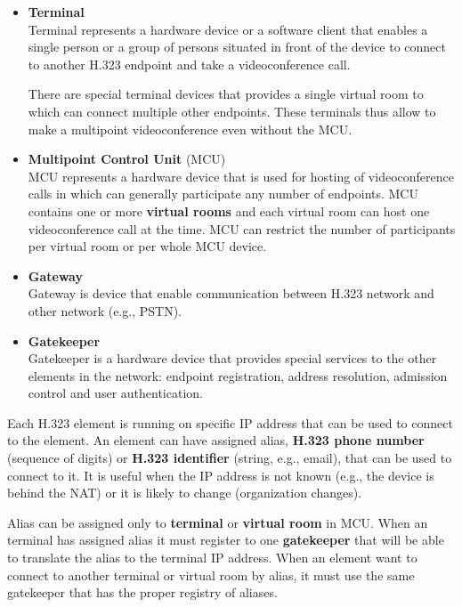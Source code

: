 \documentclass[a4paper]{report}
\begin{document}
\begin{itemize}

\item \textbf{Terminal} \\
Terminal represents a hardware device or a software client that enables a single person or a group of persons situated in front of the device to connect to another H.323 endpoint and take a videoconference call.

There are special terminal devices that provides a single virtual room to which can connect multiple other endpoints.  These terminals thus allow to make a multipoint videoconference even without the MCU.

\item \textbf{Multipoint Control Unit} (MCU) \\
MCU represents a hardware device that is used for hosting of videoconference calls in which can generally participate any number of endpoints. MCU contains one or more \textbf{virtual rooms} and each virtual room can host one videoconference call at the time. MCU can restrict the number of participants per virtual room or per whole MCU device.

\item \textbf{Gateway} \\
Gateway is device that enable communication between H.323 network and other network (e.g., PSTN).

\item \textbf{Gatekeeper} \\
Gatekeeper is a hardware device that provides special services to the other elements in the network: endpoint registration, address resolution, admission control and user authentication.

\end{itemize}

Each H.323 element is running on specific IP address that can be used to connect to the element. An element can have assigned alias, \textbf{H.323 phone number} (sequence of digits) or \textbf{H.323 identifier} (string, e.g., email), that can be used to connect to it. It is useful when the IP address is not known (e.g., the device is behind the NAT) or it is likely to change (organization changes).

Alias can be assigned only to \textbf{terminal} or \textbf{virtual room} in MCU. When an terminal has assigned alias it must register to one \textbf{gatekeeper} that will be able to translate the alias to the terminal IP address. When an element want to connect to another terminal or virtual room by alias, it must use the same gatekeeper that has the proper registry of aliases.
\end{document}

